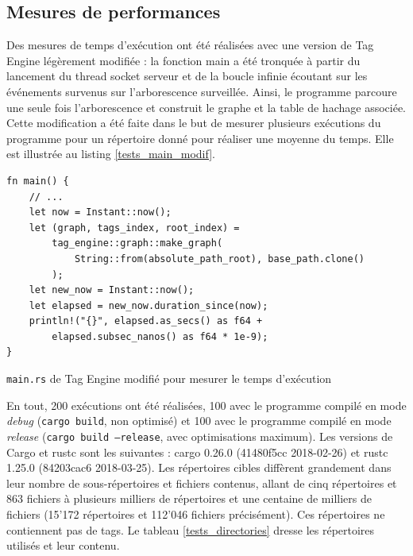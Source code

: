 \subsection{Mesures de performances}\label{mesures_performances}
Des mesures de temps d'exécution ont été réalisées avec une version de Tag Engine légèrement modifiée :
la fonction main a été tronquée à partir du lancement du thread socket serveur et de la boucle infinie 
écoutant sur les événements survenus sur l'arborescence surveillée. Ainsi, le programme parcoure 
une seule fois l'arborescence et construit le graphe et la table de hachage associée. Cette modification 
a été faite dans le but de mesurer plusieurs exécutions du programme pour un répertoire donné pour 
réaliser une moyenne du temps. Elle est illustrée au listing \ref{tests_main_modif}. 
\bigbreak
\begin{code}
    \begin{verbatim}
fn main() {
    // ...
    let now = Instant::now();
    let (graph, tags_index, root_index) = 
        tag_engine::graph::make_graph(
            String::from(absolute_path_root), base_path.clone()
        );
    let new_now = Instant::now();
    let elapsed = new_now.duration_since(now);
    println!("{}", elapsed.as_secs() as f64 + 
        elapsed.subsec_nanos() as f64 * 1e-9);
}
    \end{verbatim}
    \caption{\texttt{main.rs} de Tag Engine modifié pour mesurer le temps d'exécution}
    \label{tests_main_modif}
\end{code}
\bigbreak
En tout, 200 exécutions ont été réalisées, 100 avec le programme compilé 
en mode \textit{debug} (\texttt{cargo build}, non optimisé) et 100 avec le programme 
compilé en mode \textit{release} (\texttt{cargo build --release}, avec optimisations maximum).
Les versions de Cargo et rustc sont les suivantes : cargo 0.26.0 (41480f5cc 2018-02-26) et rustc 1.25.0 (84203cac6 2018-03-25).
Les répertoires cibles diffèrent grandement dans leur nombre de sous-répertoires et fichiers contenus, allant 
de cinq répertoires et 863 fichiers à plusieurs milliers de répertoires et une centaine de milliers 
de fichiers (15'172 répertoires et 112'046 fichiers précisément). Ces répertoires ne contiennent 
pas de tags. Le tableau \ref{tests_directories} dresse les répertoires utilisés et leur contenu.
